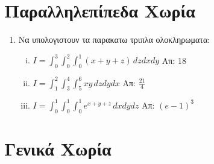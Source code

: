 


\pagestyle{askhseis}
\everymath{\displaystyle}



\begin{center}
  \minibox{\large\bf \textcolor{Col1}{Ασκήσεις Τριπλο Ολοκλήρωμα}}
\end{center}

\vspace{\baselineskip}

\section*{Παραλληλεπίπεδα Χωρία}
 

\begin{enumerate}
  \item Να υπολογιστουν τα παρακατω τριπλα ολοκληρωματα:
    \begin{enumerate}[i)]
      \item $ I=\int_{0}^{3}\!\!\int_{0}^{2}\!\!\int_{0}^{1}(x+y+z)\,dzdxdy $ 
        \hfill Απ: 18  
      \item $  I=\int_{1}^{2}\!\!\int_{3}^{4}\!\!\int_{5}^{6}xy\,dzdydx  $ 
        \hfill Απ: $ \frac{21}{4} $ 
      \item $ I=\int_{0}^{1}\!\!\int_{0}^{1}\!\!\int_{0}^{1}e^{x+y+z}\,dxdydz $ 
        \hfill Απ: $ (e-1)^{3} $
    \end{enumerate}
\end{enumerate}
    
    \section*{Γενικά Χωρία}

